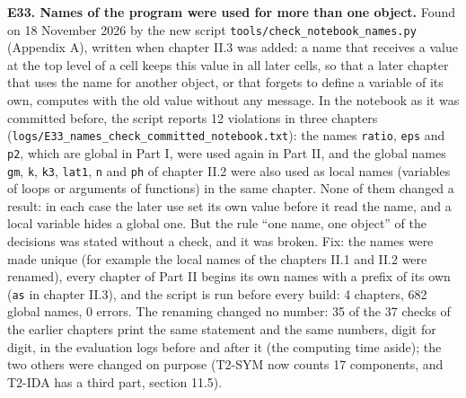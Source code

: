 \documentclass[
  10pt,
]{article}
\begin{document}
\textbf{E33. Names of the program were used for more than one object.}
Found on 18 November 2026 by the new script
\texttt{tools/check\_notebook\_names.py} (Appendix A), written when
chapter II.3 was added: a name that receives a value at the top level of
a cell keeps this value in all later cells, so that a later chapter that
uses the name for another object, or that forgets to define a variable
of its own, computes with the old value without any message. In the
notebook as it was committed before, the script reports 12 violations in
three chapters
(\texttt{logs/E33\_names\_check\_committed\_notebook.txt}): the names
\texttt{ratio}, \texttt{eps} and \texttt{p2}, which are global in Part
I, were used again in Part II, and the global names \texttt{gm},
\texttt{k}, \texttt{k3}, \texttt{lat1}, \texttt{n} and \texttt{ph} of
chapter II.2 were also used as local names (variables of loops or
arguments of functions) in the same chapter. None of them changed a
result: in each case the later use set its own value before it read the
name, and a local variable hides a global one. But the rule ``one name,
one object'' of the decisions was stated without a check, and it was
broken. Fix: the names were made unique (for example the local names of
the chapters II.1 and II.2 were renamed), every chapter of Part II
begins its own names with a prefix of its own (\texttt{as} in chapter
II.3), and the script is run before every build: 4 chapters, 682 global
names, 0 errors. The renaming changed no number: 35 of the 37 checks of
the earlier chapters print the same statement and the same numbers,
digit for digit, in the evaluation logs before and after it (the
computing time aside); the two others were changed on purpose (T2-SYM
now counts 17 components, and T2-IDA has a third part, section 11.5).
\end{document}
